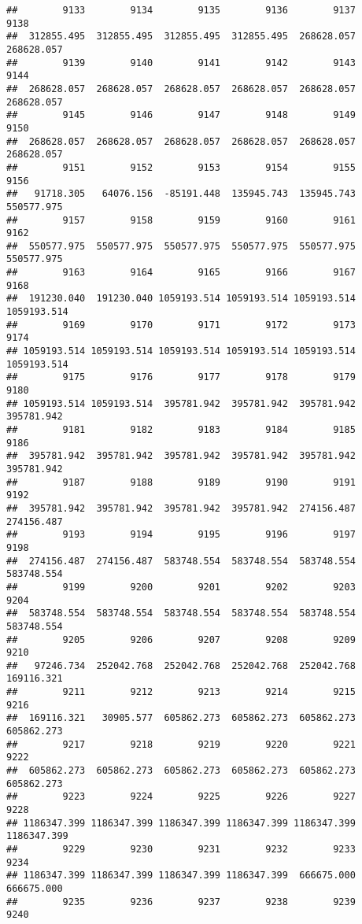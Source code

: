 \documentclass[
]{book}
\begin{document}
\begin{verbatim}
##        9133        9134        9135        9136        9137        9138 
##  312855.495  312855.495  312855.495  312855.495  268628.057  268628.057 
##        9139        9140        9141        9142        9143        9144 
##  268628.057  268628.057  268628.057  268628.057  268628.057  268628.057 
##        9145        9146        9147        9148        9149        9150 
##  268628.057  268628.057  268628.057  268628.057  268628.057  268628.057 
##        9151        9152        9153        9154        9155        9156 
##   91718.305   64076.156  -85191.448  135945.743  135945.743  550577.975 
##        9157        9158        9159        9160        9161        9162 
##  550577.975  550577.975  550577.975  550577.975  550577.975  550577.975 
##        9163        9164        9165        9166        9167        9168 
##  191230.040  191230.040 1059193.514 1059193.514 1059193.514 1059193.514 
##        9169        9170        9171        9172        9173        9174 
## 1059193.514 1059193.514 1059193.514 1059193.514 1059193.514 1059193.514 
##        9175        9176        9177        9178        9179        9180 
## 1059193.514 1059193.514  395781.942  395781.942  395781.942  395781.942 
##        9181        9182        9183        9184        9185        9186 
##  395781.942  395781.942  395781.942  395781.942  395781.942  395781.942 
##        9187        9188        9189        9190        9191        9192 
##  395781.942  395781.942  395781.942  395781.942  274156.487  274156.487 
##        9193        9194        9195        9196        9197        9198 
##  274156.487  274156.487  583748.554  583748.554  583748.554  583748.554 
##        9199        9200        9201        9202        9203        9204 
##  583748.554  583748.554  583748.554  583748.554  583748.554  583748.554 
##        9205        9206        9207        9208        9209        9210 
##   97246.734  252042.768  252042.768  252042.768  252042.768  169116.321 
##        9211        9212        9213        9214        9215        9216 
##  169116.321   30905.577  605862.273  605862.273  605862.273  605862.273 
##        9217        9218        9219        9220        9221        9222 
##  605862.273  605862.273  605862.273  605862.273  605862.273  605862.273 
##        9223        9224        9225        9226        9227        9228 
## 1186347.399 1186347.399 1186347.399 1186347.399 1186347.399 1186347.399 
##        9229        9230        9231        9232        9233        9234 
## 1186347.399 1186347.399 1186347.399 1186347.399  666675.000  666675.000 
##        9235        9236        9237        9238        9239        9240 

\end{verbatim}
\end{document}
